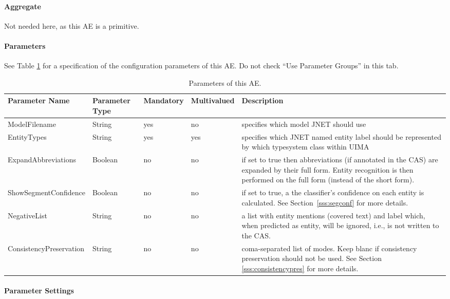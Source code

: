 \documentclass[11pt,a4paper,halfparskip]{scrartcl}
\begin{document}
\paragraph{Aggregate}
Not needed here, as this AE is a primitive.

\paragraph{Parameters}
\label{sss:parameters}

See Table \ref{tab:parameters} for a specification of the
configuration parameters of this AE. Do not check ``Use Parameter
Groups'' in this tab.

\begin{table}[h!]
  \centering
  \begin{tabular}{|p{4cm}|p{2cm}|p{2cm}|p{2cm}|p{4cm}|}
    \hline
    Parameter Name & Parameter Type & Mandatory & Multivalued & Description \\
    \hline\hline
    ModelFilename & String & yes & no & specifies which model JNET
    should use\\
    \hline
    EntityTypes & String & yes & yes & specifies which JNET named entity
    label should be represented by which typesystem class within UIMA\\
    \hline
    ExpandAbbreviations & Boolean & no & no & if set to true then abbreviations (if annotated in the CAS) are expanded by their full form. Entity recognition is then performed on the full form (instead of the short form).\\
    \hline
    ShowSegmentConfidence & Boolean & no & no & if set to true, a the classifier's confidence on each entity is calculated. See Section~\ref{sss:segconf} for more details.\\
    \hline
    NegativeList & String & no & no & a list with entity mentions (covered text) and label which, when predicted as entity, will be ignored, i.e., is not written to the CAS. \\
    \hline
    ConsistencyPreservation & String & no & no & coma-separated list of modes. Keep blanc if consistency preservation should not be used. See Section \ref{sss:consistencypres} for more details.\\
    \hline  
  \end{tabular}
  \caption{Parameters of this AE.}
  \label{tab:parameters}
\end{table}

\paragraph{Parameter Settings}
\label{sss:param_settings}
\end{document}
